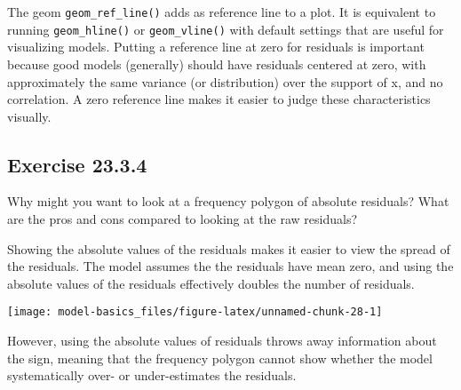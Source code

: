 \documentclass[]{book}
\newenvironment{Shaded}{\begin{snugshade}}{\end{snugshade}}
\newcommand{\DataTypeTok}[1]{\textcolor[rgb]{0.13,0.29,0.53}{#1}}
\newcommand{\FloatTok}[1]{\textcolor[rgb]{0.00,0.00,0.81}{#1}}
\newcommand{\KeywordTok}[1]{\textcolor[rgb]{0.13,0.29,0.53}{\textbf{#1}}}
\newcommand{\NormalTok}[1]{#1}
\newcommand{\OperatorTok}[1]{\textcolor[rgb]{0.81,0.36,0.00}{\textbf{#1}}}
\newcommand{\StringTok}[1]{\textcolor[rgb]{0.31,0.60,0.02}{#1}}
\theoremstyle{plain}
\theoremstyle{remark}
\theoremstyle{definition}
\theoremstyle{definition}
\theoremstyle{definition}
\theoremstyle{remark}
\begin{document}
The geom \texttt{geom\_ref\_line()} adds as reference line to a plot. It
is equivalent to running \texttt{geom\_hline()} or
\texttt{geom\_vline()} with default settings that are useful for
visualizing models. Putting a reference line at zero for residuals is
important because good models (generally) should have residuals centered
at zero, with approximately the same variance (or distribution) over the
support of x, and no correlation. A zero reference line makes it easier
to judge these characteristics visually.

\hypertarget{exercise-23.3.4}{%
\subsection*{\texorpdfstring{Exercise
{23.3.4}}{Exercise 23.3.4}}\label{exercise-23.3.4}}

Why might you want to look at a frequency polygon of absolute residuals?
What are the pros and cons compared to looking at the raw residuals?

Showing the absolute values of the residuals makes it easier to view the
spread of the residuals. The model assumes the the residuals have mean
zero, and using the absolute values of the residuals effectively doubles
the number of residuals.

\begin{Shaded}
\end{Shaded}

\begin{center}\texttt{[image: model-basics\_files/figure-latex/unnamed-chunk-28-1]} \end{center}

However, using the absolute values of residuals throws away information
about the sign, meaning that the frequency polygon cannot show whether
the model systematically over- or under-estimates the residuals.
\end{document}
